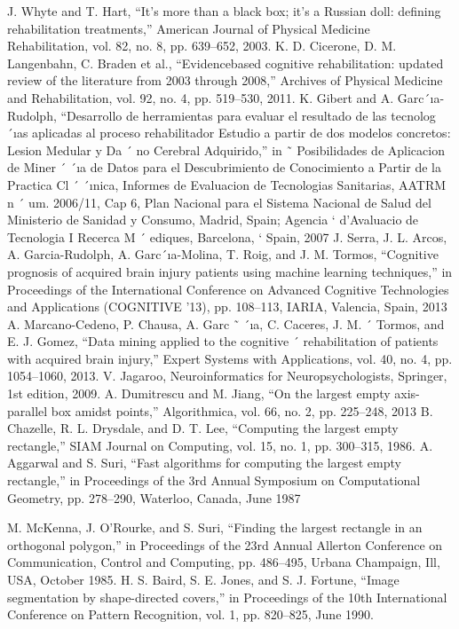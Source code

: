 \begin{thebibliography}{31}
 J. Whyte and T. Hart, “It’s more than a black box; it’s a Russian
doll: defining rehabilitation treatments,” American Journal of
Physical Medicine  Rehabilitation, vol. 82, no. 8, pp. 639–652,
2003.
K. D. Cicerone, D. M. Langenbahn, C. Braden et al., “Evidencebased cognitive rehabilitation: updated review of the literature
from 2003 through 2008,” Archives of Physical Medicine and
Rehabilitation, vol. 92, no. 4, pp. 519–530, 2011.
 K. Gibert and A. Garc´ıa-Rudolph, “Desarrollo de herramientas
para evaluar el resultado de las tecnolog´ıas aplicadas al proceso rehabilitador Estudio a partir de dos modelos concretos:
Lesion Medular y Da ´ no Cerebral Adquirido,” in ˜ Posibilidades
de Aplicacion de Miner ´ ´ıa de Datos para el Descubrimiento
de Conocimiento a Partir de la Practica Cl ´ ´ınica, Informes de
Evaluacion de Tecnologias Sanitarias, AATRM n ´ um. 2006/11,
Cap 6, Plan Nacional para el Sistema Nacional de Salud del
Ministerio de Sanidad y Consumo, Madrid, Spain; Agencia `
d’Avaluacio de Tecnologia I Recerca M ´ ediques, Barcelona, `
Spain, 2007
J. Serra, J. L. Arcos, A. Garcia-Rudolph, A. Garc´ıa-Molina, T.
Roig, and J. M. Tormos, “Cognitive prognosis of acquired brain
injury patients using machine learning techniques,” in Proceedings of the International Conference on Advanced Cognitive
Technologies and Applications (COGNITIVE ’13), pp. 108–113,
IARIA, Valencia, Spain, 2013
 A. Marcano-Cedeno, P. Chausa, A. Garc ˜ ´ıa, C. Caceres, J. M. ´
Tormos, and E. J. Gomez, “Data mining applied to the cognitive ´
rehabilitation of patients with acquired brain injury,” Expert
Systems with Applications, vol. 40, no. 4, pp. 1054–1060, 2013.
 V. Jagaroo, Neuroinformatics for Neuropsychologists, Springer,
1st edition, 2009.
A. Dumitrescu and M. Jiang, “On the largest empty axis-parallel
box amidst points,” Algorithmica, vol. 66, no. 2, pp. 225–248,
2013
B. Chazelle, R. L. Drysdale, and D. T. Lee, “Computing the
largest empty rectangle,” SIAM Journal on Computing, vol. 15,
no. 1, pp. 300–315, 1986.
 A. Aggarwal and S. Suri, “Fast algorithms for computing the
largest empty rectangle,” in Proceedings of the 3rd Annual Symposium on Computational Geometry, pp. 278–290, Waterloo,
Canada, June 1987

 M. McKenna, J. O’Rourke, and S. Suri, “Finding the largest
rectangle in an orthogonal polygon,” in Proceedings of the 23rd
Annual Allerton Conference on Communication, Control and
Computing, pp. 486–495, Urbana Champaign, Ill, USA, October
1985.
H. S. Baird, S. E. Jones, and S. J. Fortune, “Image segmentation
by shape-directed covers,” in Proceedings of the 10th International Conference on Pattern Recognition, vol. 1, pp. 820–825,
June 1990.


\end{thebibliography}
